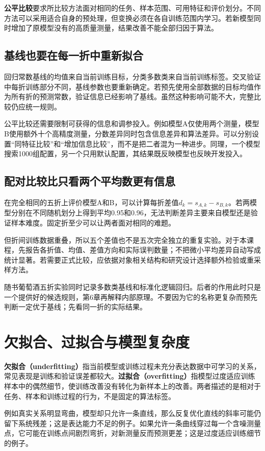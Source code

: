 \textbf{公平比较}要求所比较方法面对相同的任务、样本范围、可用特征和评价划分。不同方法可以采用适合自身的预处理，但变换必须在各自训练范围内学习。若新模型同时增加了原模型没有的高质量测量，结果改善不能全部归因于算法。

\subsection{基线也要在每一折中重新拟合}
回归常数基线的均值来自当前训练目标，分类多数类来自当前训练标签。交叉验证中每折训练部分不同，基线参数也要重新确定。若预先使用全部数据的目标均值作为所有折的预测常数，验证信息已经影响了基线。虽然这种影响可能不大，完整比较仍应统一规则。

公平比较还需要限制可获得的信息和调参投入。例如模型A仅使用两个测量，模型B使用额外十个高精度测量，分数差异同时包含信息差异和算法差异。可以分别设置“同特征比较”和“增加信息比较”，而不是把二者混为一种进步。同理，一个模型搜索1000组配置，另一个只用默认配置，其结果既反映模型也反映开发投入。

\subsection{配对比较比只看两个平均数更有信息}
在完全相同的五折上评价模型A和B，可以计算每折差值$d_k=s_{A,k}-s_{B,k}$。若两模型分别在不同随机划分上得到平均0.95和0.96，无法判断差异主要来自模型还是验证样本难度。固定折至少可以让两者面对相同的难题。

但折间训练数据重叠，所以五个差值也不是五次完全独立的重复实验。对于本课程，先报告各折值、均值、差值方向和实际误判数量；不把微小平均差异自动写成统计显著。若需要正式比较，应依据对象相关结构和研究设计选择额外检验或重采样方法。

随书葡萄酒五折实验同时记录多数类基线和标准化逻辑回归。后者的作用此时只是一个提供好的候选规则，第6章再解释内部原理。不要因为它的名称更复杂而预先判断一定优于基线；先看同一折的实际结果。

\section{欠拟合、过拟合与模型复杂度}
\textbf{欠拟合（underfitting）}指当前模型或训练过程未充分表达数据中可学习的关系，常见表现是训练和验证误差都较大。\textbf{过拟合（overfitting）}指模型过度适应训练样本中的偶然细节，使训练改善没有转化为新样本上的改善。两者描述的是相对于任务、样本和训练过程的行为，不是固定的算法标签。

例如真实关系明显弯曲，模型却只允许一条直线，那么反复优化直线的斜率可能仍留下系统残差；这是表达能力不足的例子。如果允许一条曲线穿过每一个含噪测量点，它可能在训练点间剧烈弯折，对新测量反而预测更差；这是过度适应训练细节的例子。

